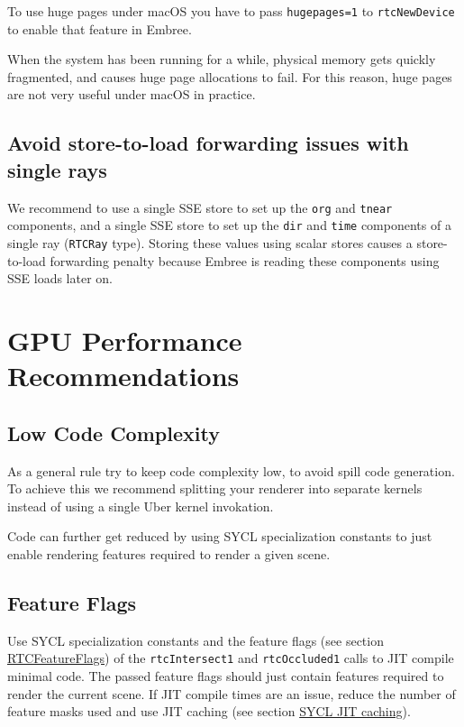 To use huge pages under macOS you have to pass \texttt{hugepages=1} to
\texttt{rtcNewDevice} to enable that feature in Embree.

When the system has been running for a while, physical memory gets
quickly fragmented, and causes huge page allocations to fail. For this
reason, huge pages are not very useful under macOS in practice.

\section{Avoid store-to-load forwarding issues with single
rays}\label{avoid-store-to-load-forwarding-issues-with-single-rays}

We recommend to use a single SSE store to set up the \texttt{org} and
\texttt{tnear} components, and a single SSE store to set up the
\texttt{dir} and \texttt{time} components of a single ray
(\texttt{RTCRay} type). Storing these values using scalar stores causes
a store-to-load forwarding penalty because Embree is reading these
components using SSE loads later on.

\pagebreak

\chapter{GPU Performance
Recommendations}\label{gpu-performance-recommendations}

\section{Low Code Complexity}\label{low-code-complexity}

As a general rule try to keep code complexity low, to avoid spill code
generation. To achieve this we recommend splitting your renderer into
separate kernels instead of using a single Uber kernel invokation.

Code can further get reduced by using SYCL specialization constants to
just enable rendering features required to render a given scene.

\section{Feature Flags}\label{feature-flags}

Use SYCL specialization constants and the feature flags (see section
\hyperref[rtcfeatureflags]{RTCFeatureFlags}) of the
\texttt{rtcIntersect1} and \texttt{rtcOccluded1} calls to JIT compile
minimal code. The passed feature flags should just contain features
required to render the current scene. If JIT compile times are an issue,
reduce the number of feature masks used and use JIT caching (see section
\hyperref[sycl-jit-caching]{SYCL JIT caching}).

